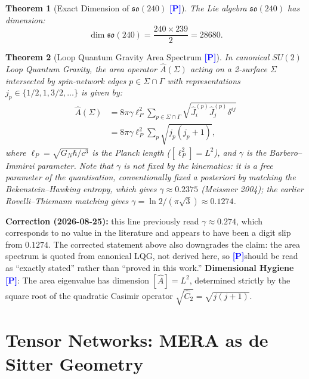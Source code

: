 \documentclass[aps,prd,twocolumn,superscriptaddress,nofootinbib,floatfix]{revtex4-2}
\newcommand{\tagP}{\textcolor{blue}{\textbf{[P]}}}
\theoremstyle{plain}
\newtheorem{theorem}{Theorem}[section]
\theoremstyle{definition}
\begin{document}
\begin{theorem}[Exact Dimension of $\mathfrak{so}(240)$ \tagP]
\label{thm:so240}
The Lie algebra $\mathfrak{so}(240)$ has dimension:
\begin{equation}
\dim \mathfrak{so}(240) = \frac{240 \times 239}{2} = 28680.
\end{equation}
\end{theorem}

\begin{theorem}[Loop Quantum Gravity Area Spectrum \tagP]
\label{thm:lqg_area}
In canonical $SU(2)$ Loop Quantum Gravity, the area operator $\hat{A}(\Sigma)$ acting on a 2-surface $\Sigma$ intersected by spin-network edges $p \in \Sigma \cap \Gamma$ with representations $j_p \in \{1/2, 1, 3/2, \dots\}$ is given by:
\begin{align}
\hat{A}(\Sigma) &= 8\pi \gamma \ell_P^2 \sum_{p \in \Sigma \cap \Gamma} \sqrt{\hat{J}_i^{(p)} \hat{J}_j^{(p)} \delta^{ij}} \nonumber \\
&= 8\pi \gamma \ell_P^2 \sum_{p} \sqrt{j_p(j_p+1)},
\label{eq:lqg_area}
\end{align}
where $\ell_P = \sqrt{G_N \hbar / c^3}$ is the Planck length ($[\ell_P^2] = L^2$), and $\gamma$ is
the Barbero--Immirzi parameter. Note that $\gamma$ is \emph{not} fixed by the kinematics: it is a
free parameter of the quantisation, conventionally fixed a posteriori by matching the
Bekenstein--Hawking entropy, which gives $\gamma \approx 0.2375$ (Meissner 2004); the earlier
Rovelli--Thiemann matching gives $\gamma = \ln 2/(\pi\sqrt{3}) \approx 0.1274$.
\end{theorem}
\noindent \textbf{Correction (2026-08-25):} this line previously read
$\gamma \approx 0.274$, which corresponds to no value in the literature and appears to have been
a digit slip from $0.1274$. The corrected statement above also downgrades the claim: the area
spectrum is quoted from canonical LQG, not derived here, so \tagP should be read as
``exactly stated'' rather than ``proved in this work.''
\noindent \textbf{Dimensional Hygiene} \tagP: The area eigenvalue has dimension $[\hat{A}] = L^2$, determined strictly by the square root of the quadratic Casimir operator $\sqrt{\hat{C}_2} = \sqrt{j(j+1)}$.

\section{Tensor Networks: MERA as de Sitter Geometry}
\label{sec:mera}
\end{document}
